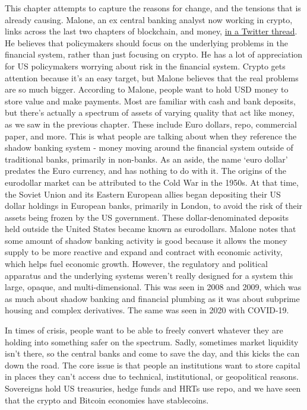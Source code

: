 This chapter attempts to capture the reasons for change, and the tensions that is already causing. Malone, an ex central banking analyst now working in crypto, links across the last two chapters of blockchain, and money, \href{https://twitter.com/brendanpmalone/status/1628067806984937472}{in a Twitter thread}. He believes that policymakers should focus on the underlying problems in the financial system, rather than just focusing on crypto. He has a lot of appreciation for US policymakers worrying about risk in the financial system. Crypto gets  attention because it's an easy target, but Malone believes that the real problems are so much bigger. According to Malone, people want to hold USD money to store value and make payments. Most are familiar with cash and bank deposits, but there's actually a spectrum of assets of varying quality that act like money, as we saw in the previous chapter. These include Euro dollars, repo, commercial paper, and more. This is what people are talking about when they reference the shadow banking system - money moving around the financial system outside of traditional banks, primarily in non-banks. As an aside, the name `euro dollar' predates the Euro currency, and has nothing to do with it. The origins of the eurodollar market can be attributed to the Cold War in the 1950s. At that time, the Soviet Union and its Eastern European allies began depositing their US dollar holdings in European banks, primarily in London, to avoid the risk of their assets being frozen by the US government. These dollar-denominated deposits held outside the United States became known as eurodollars. Malone notes that some amount of shadow banking activity is good because it allows the money supply to be more reactive and expand and contract with economic activity, which helps fuel economic growth. However, the regulatory and political apparatus and the underlying systems weren't really designed for a system this large, opaque, and multi-dimensional. This was seen in 2008 and 2009, which was as much about shadow banking and financial plumbing as it was about subprime housing and complex derivatives. The same was seen in 2020 with COVID-19.\par
In times of crisis, people want to be able to freely convert whatever they are holding into something safer on the spectrum. Sadly, sometimes market liquidity isn't there, so the central banks and come to save the day, and this kicks the can down the road. The core issue is that people an institutions want to store capital in places they can't access due to technical, institutional, or geopolitical reasons. Sovereigns hold US treasuries, hedge funds and HRTs use repo, and we have seen that the crypto and Bitcoin economies have stablecoins.\par

